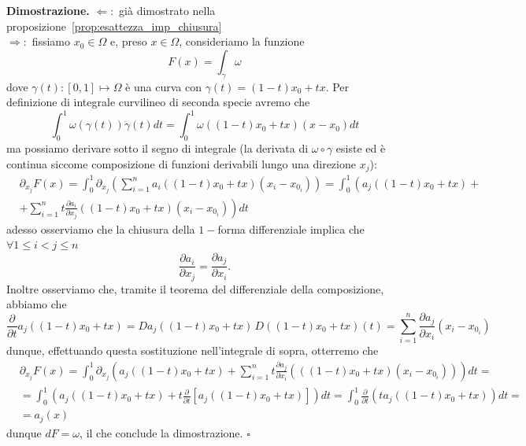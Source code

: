 \noindent \textbf{Dimostrazione. }
	$\boxed{\Leftarrow}:$ già dimostrato nella proposizione~\ref{prop:esattezza_imp_chiusura} \\
	$\boxed{\Rightarrow}:$ %
	fissiamo $x_0 \in \Omega$ e, preso $x \in \Omega$, consideriamo la funzione
	$$
		F(x) = \int_\gamma \omega
	$$
	dove $\gamma(t) : [0, 1] \mapsto \Omega$ è una curva con $\gamma(t)=(1-t) x_0 + tx$. Per definizione di integrale curvilineo di seconda specie avremo che
	$$
		\int_0^1 \omega(\gamma(t)) \dot{\gamma}(t) dt = \int_0^1 \omega((1-t)x_0 + tx)(x-x_0)dt
	$$
	ma possiamo derivare sotto il segno di integrale (la derivata di $\omega \circ \gamma$ esiste ed è continua siccome composizione di funzioni derivabili lungo una direzione $x_j$):
	\begin{align*}
	&\partial_{x_j} F(x) = \int_0^1 \partial_{x_j} \left(\sum_{i=1}^n a_i((1-t)x_0 + tx)(x_i-x_{0_i}) \right) = \int_0^1 \left(a_j((1-t)x_0 + tx) + \right. \\
	&+ \left. \sum_{i=1}^n t\frac{\partial a_i}{\partial x_j}((1-t)x_0 + tx)(x_i - x_{0_i}) \right) dt
	\end{align*}
	adesso osserviamo che la chiusura della $1-$forma differenziale implica che $\forall 1 \leq i < j \leq n$
	$$
	\frac{\partial a_i}{\partial x_j} = \frac{\partial a_j}{\partial x_i}.
	$$
	Inoltre osserviamo che, tramite il teorema del differenziale della composizione, abbiamo che 
	$$
		\frac{\partial}{\partial t} a_j((1-t)x_0 + tx) = Da_j((1-t)x_0 + tx) \, D((1-t)x_0 + tx)(t) = \sum_{i=1}^n \frac{\partial a_j}{\partial x_i}(x_i - x_{0_i})
	$$
	dunque, effettuando questa sostituzione nell'integrale di sopra, otterremo che
	\begin{align*}
	&\partial_{x_j} F(x) = \int_0^1 \partial_{x_j} \left(a_j((1-t)x_0 + tx) + \sum_{i=1}^n t\frac{\partial a_j}{\partial x_i} \left( ((1-t)x_0 + tx) (x_i - x_{0_i}) \right) \right) dt = \\
	&=\int_0^1 \left( a_j((1-t)x_0 + tx) + t\frac{\partial}{\partial t} \left[ a_j((1-t)x_0 + tx) \right] \right)dt = \int_0^1 \frac{\partial}{\partial t} \left( ta_j((1-t)x_0 + tx) \right)dt = \\
	&=a_j(x) 
	\end{align*}
	dunque $dF=\omega$, il che conclude la dimostrazione.
\hfill $\square$

